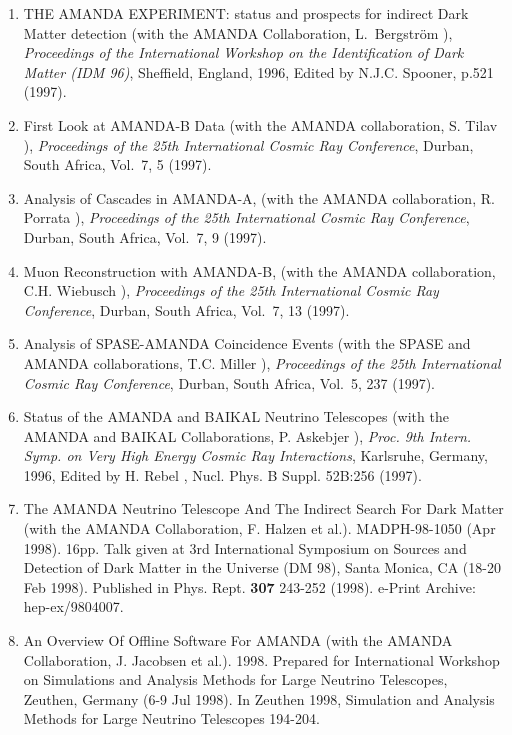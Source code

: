 \begin{enumerate}
\item   THE AMANDA EXPERIMENT: status and prospects for indirect Dark Matter
        detection (with the AMANDA Collaboration, L.~Bergstr\"{o}m \etal),
        {\it Proceedings of the International Workshop on the
        Identification of Dark Matter (IDM 96)}, Sheffield, England, 1996, Edited by 
        N.J.C. Spooner, p.521 (1997).


\item   First Look at AMANDA-B Data (with
        the AMANDA collaboration, S. Tilav \etal),
        {\it Proceedings of the 25th International Cosmic Ray Conference}, Durban,
        South Africa, Vol.~7, 5 (1997).

\item   Analysis of Cascades in AMANDA-A,
        (with the AMANDA collaboration, R. Porrata \etal),
        {\it Proceedings of the 25th International Cosmic Ray Conference}, Durban,
        South Africa, Vol.~7, 9 (1997).

\item   Muon Reconstruction with AMANDA-B, (with
        the AMANDA collaboration, C.H. Wiebusch \etal),
        {\it Proceedings of the 25th International Cosmic Ray Conference}, Durban,
        South Africa, Vol.~7, 13 (1997).

\item    Analysis of SPASE-AMANDA Coincidence Events
         (with the SPASE and AMANDA collaborations, T.C. Miller \etal),
         {\it Proceedings of the 25th International Cosmic Ray Conference},
         Durban,
         South Africa, Vol.~5, 237 (1997).

\item    Status of the AMANDA and BAIKAL Neutrino Telescopes
         (with the AMANDA and BAIKAL Collaborations, P. Askebjer \etal),
         {\it Proc. 9th Intern. Symp. on Very High Energy Cosmic Ray 
         Interactions}, Karlsruhe, Germany, 1996, 
         Edited by H. Rebel \etal, Nucl. Phys. B Suppl. 52B:256 (1997).

\item The AMANDA Neutrino Telescope And The Indirect Search For Dark Matter (with the AMANDA Collaboration, F. Halzen et al.). MADPH-98-1050 (Apr 1998). 16pp.  Talk given at 3rd International Symposium on Sources and Detection of Dark Matter in the Universe (DM 98), Santa Monica, CA (18-20 Feb 1998).  Published in Phys. Rept. {\bf 307}  243-252 (1998).  e-Print Archive: hep-ex/9804007.

\item An Overview Of Offline Software For AMANDA (with the AMANDA Collaboration, J. Jacobsen et al.). 1998.  Prepared for International Workshop on Simulations and Analysis Methods for Large Neutrino Telescopes, Zeuthen, Germany (6-9 Jul 1998). In Zeuthen 1998, Simulation and Analysis Methods for Large Neutrino Telescopes 194-204. 


\end{enumerate}
